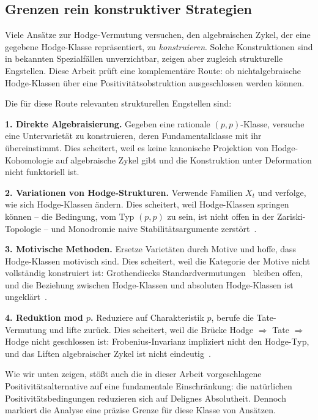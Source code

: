 \documentclass[aps,prd,twocolumn,superscriptaddress,nofootinbib]{revtex4-2}
\theoremstyle{definition}
\theoremstyle{remark}
\begin{document}
\subsection{Grenzen rein konstruktiver Strategien}

Viele Ansätze zur Hodge-Vermutung versuchen, den algebraischen Zykel, der eine gegebene Hodge-Klasse repräsentiert, zu \textit{konstruieren}. Solche Konstruktionen sind in bekannten Spezialfällen unverzichtbar, zeigen aber zugleich strukturelle Engstellen. Diese Arbeit prüft eine komplementäre Route: ob nichtalgebraische Hodge-Klassen über eine Positivitätsobstruktion ausgeschlossen werden können.

Die für diese Route relevanten strukturellen Engstellen sind:

\textbf{1. Direkte Algebraisierung.} Gegeben eine rationale $(p,p)$-Klasse, versuche eine Untervarietät zu konstruieren, deren Fundamentalklasse mit ihr übereinstimmt. Dies scheitert, weil es keine kanonische Projektion von Hodge-Kohomologie auf algebraische Zykel gibt und die Konstruktion unter Deformation nicht funktoriell ist.

\textbf{2. Variationen von Hodge-Strukturen.} Verwende Familien $X_t$ und verfolge, wie sich Hodge-Klassen ändern. Dies scheitert, weil Hodge-Klassen \glqq springen\grqq{} können -- die Bedingung, vom Typ $(p,p)$ zu sein, ist nicht offen in der Zariski-Topologie -- und Monodromie naive Stabilitätsargumente zerstört~\cite{Voisin2002}.

\textbf{3. Motivische Methoden.} Ersetze Varietäten durch Motive und hoffe, dass Hodge-Klassen motivisch sind. Dies scheitert, weil die Kategorie der Motive nicht vollständig konstruiert ist: Grothendiecks Standardvermutungen~\cite{Grothendieck1969} bleiben offen, und die Beziehung zwischen Hodge-Klassen und absoluten Hodge-Klassen ist ungeklärt~\cite{Andre1996}.

\textbf{4. Reduktion mod $p$.} Reduziere auf Charakteristik $p$, berufe die Tate-Vermutung und lifte zurück. Dies scheitert, weil die Brücke Hodge $\Rightarrow$ Tate $\Rightarrow$ Hodge nicht geschlossen ist: Frobenius-Invarianz impliziert nicht den Hodge-Typ, und das Liften algebraischer Zykel ist nicht eindeutig~\cite{Charles2013}.

Wie wir unten zeigen, stößt auch die in dieser Arbeit vorgeschlagene Positivitätsalternative auf eine fundamentale Einschränkung: die natürlichen Positivitätsbedingungen reduzieren sich auf Delignes Absolutheit. Dennoch markiert die Analyse eine präzise Grenze für diese Klasse von Ansätzen.
\end{document}
